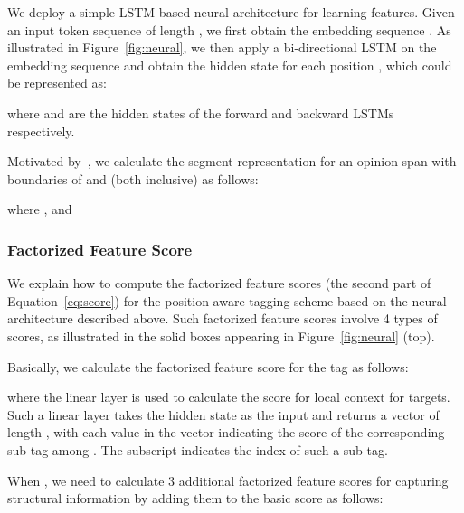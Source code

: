 \documentclass[11pt,a4paper]{article}
\begin{document}
We deploy a simple LSTM-based neural architecture for learning features.
Given an input token sequence  of length , we first obtain the embedding sequence . As illustrated in Figure~\ref{fig:neural}, we then apply a bi-directional LSTM on the embedding sequence and obtain the hidden state  for each position , which could be represented as:
\setlength{\abovedisplayskip}{4pt} \setlength{\abovedisplayshortskip}{4pt}
\setlength{\belowdisplayskip}{4pt} \setlength{\belowdisplayshortskip}{4pt}

where  and  are the hidden states of the forward and backward LSTMs respectively.




Motivated by~\cite{wang2016graph, stern2017minimal}, we calculate the segment representation  for an opinion span with {\color{black}boundaries of  and  (both inclusive)} as follows:
\setlength{\abovedisplayskip}{4pt} \setlength{\abovedisplayshortskip}{4pt}
\setlength{\belowdisplayskip}{4pt} \setlength{\belowdisplayshortskip}{4pt}

where ,  and 



\subsubsection{Factorized Feature Score}
We explain how to compute the factorized feature scores (the second part of Equation~\ref{eq:score}) for the position-aware  tagging scheme based on the neural architecture described above.
Such factorized feature scores involve 4 types of scores, as illustrated in the solid boxes appearing in Figure~\ref{fig:neural} (top).


Basically, we calculate the factorized feature score for the tag  as follows:
\setlength{\abovedisplayskip}{4pt} \setlength{\abovedisplayshortskip}{4pt}
\setlength{\belowdisplayskip}{4pt} \setlength{\belowdisplayshortskip}{4pt}

where the linear layer  is used to calculate the score for local context for targets.
Such a linear layer takes the hidden state  as the input and returns a vector of length , with each value in the vector indicating the score of the corresponding sub-tag among . 
The subscript  indicates the index of such a sub-tag.

When , we need to calculate 3 additional factorized feature scores for capturing structural information by adding them to the basic score as follows:
\setlength{\abovedisplayskip}{3pt} \setlength{\abovedisplayshortskip}{3pt}
\setlength{\belowdisplayskip}{3pt} \setlength{\belowdisplayshortskip}{3pt}
\end{document}
